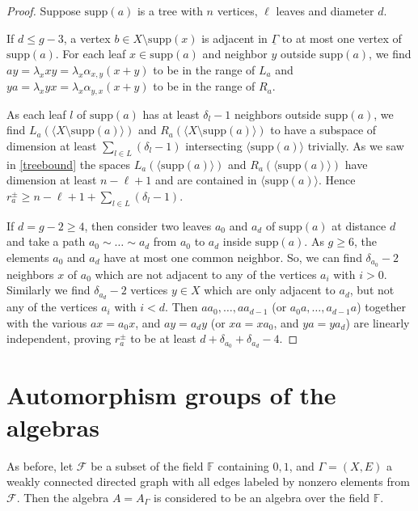\documentclass[oneside,a4paper]{amsart} %
\theoremstyle{definition}
\begin{document}
\begin{proof}
Suppose $\mathrm{supp}(a)$ is a   tree  with $n$ vertices, $\ell$ leaves and diameter $d$.

If $d\leq g-3$, a vertex $b\in X\setminus\mathrm{supp}(x)$ is adjacent in $\underline{\Gamma}$ to at most one vertex of $\mathrm{supp}(a)$.
For  each leaf $x\in \mathrm{supp}(a)$ and neighbor $y$ outside $\mathrm{supp}(a)$, 
we find $ay=\lambda_x xy=\lambda_x\alpha_{x,y} (x+y)$ to be in the range of $L_a$
and $ya=\lambda_x yx=\lambda_x\alpha_{y,x} (x+y)$ to be in the range of $R_a$.

As each leaf $l$ of $\mathrm{supp}(a)$ has at least $\delta_l-1$ neighbors outside $\mathrm{supp}(a)$, we find 
$L_a(\langle X\setminus\mathrm{supp}(a)\rangle)$ and $R_a(\langle X\setminus\mathrm{supp}(a)\rangle)$ to have a subspace of dimension at least $\displaystyle\sum_{l \in L}(\delta_l-1)$ intersecting $\langle \mathrm{supp}(a)\rangle$ trivially.
As we saw in \cref{treebound} the spaces  $L_a(\langle \mathrm{supp}(a)\rangle)$ and  $R_a(\langle \mathrm{supp}(a)\rangle)$ have dimension at least $n-\ell+1$
and are contained in $\langle \mathrm{supp}(a)\rangle$.
Hence $r^\pm_a\geq n-\ell+1+\displaystyle\sum_{l\in L}(\delta_{l}-1)$.

If $d=g-2\geq 4$, then consider two leaves $a_0$ and $a_d$ of $\mathrm{supp}(a)$ at distance $d$
and take a path $a_0\sim\dots \sim a_d$ from $a_0$ to $a_d$ inside $\mathrm{supp}(a)$.
As $g\geq 6$, the elements $a_0$ and $a_d$ have at most one common neighbor.
So, we can find $\delta_{a_0}-2$ neighbors $x$ of $a_0$ 
which are not adjacent to  any of the vertices $a_i$ with $i>0$. 
Similarly we find  $\delta_{a_d}-2$ vertices $y\in X$ which are only adjacent to $a_d$, but not any of the vertices $a_i$ with $i<d$.
Then $aa_0,\dots, aa_{d-1}$ (or $a_0a,\dots, a_{d-1}a$)
together with the various $ax=a_0x$, and $ay=a_dy$ (or $xa=xa_0$, and $ya=ya_d$)  are linearly independent, proving $r^\pm_a$ to be at least $d+\delta_{a_0}+\delta_{a_d}-4$.  
\end{proof}


\section{Automorphism groups of the algebras}
\label{section:auto}


As before, let $\mathcal{F}$ be a subset of the field $\mathbb{F}$ containing $0,1$, and $\Gamma=(X,E)$ a weakly connected directed graph
with all edges labeled by nonzero elements from $\mathcal{F}$. 
Then the algebra $A=A_\Gamma$ is considered to be an algebra over the field $\mathbb{F}$.
\end{document}
